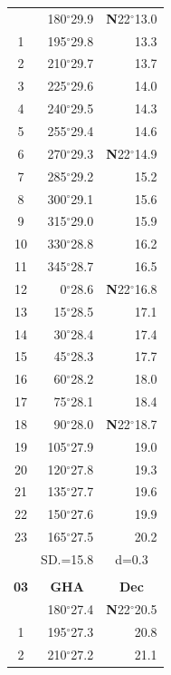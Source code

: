 \documentclass[10pt, a4paper]{report}
\begin{document}
\begin{scriptsize}
\begin{tabular*}{0.2\textwidth}[t]{@{\extracolsep{\fill}}|c|rr|}
\hline\rule{0pt}{2.6ex}\noindent
0 & 180$^\circ$29.9 & \textbf{N}22$^\circ$13.0\\
1 & 195$^\circ$29.8 & 13.3\\
2 & 210$^\circ$29.7 & 13.7\\
3 & 225$^\circ$29.6 & \raisebox{0.24ex}{\boldmath$\cdot$~\boldmath$\cdot$~~}14.0\\
4 & 240$^\circ$29.5 & 14.3\\
5 & 255$^\circ$29.4 & 14.6\\[2Pt]
6 & 270$^\circ$29.3 & \textbf{N}22$^\circ$14.9\\
7 & 285$^\circ$29.2 & 15.2\\
8 & 300$^\circ$29.1 & 15.6\\
9 & 315$^\circ$29.0 & \raisebox{0.24ex}{\boldmath$\cdot$~\boldmath$\cdot$~~}15.9\\
10 & 330$^\circ$28.8 & 16.2\\
11 & 345$^\circ$28.7 & 16.5\\[2Pt]
12 & 0$^\circ$28.6 & \textbf{N}22$^\circ$16.8\\
13 & 15$^\circ$28.5 & 17.1\\
14 & 30$^\circ$28.4 & 17.4\\
15 & 45$^\circ$28.3 & \raisebox{0.24ex}{\boldmath$\cdot$~\boldmath$\cdot$~~}17.7\\
16 & 60$^\circ$28.2 & 18.0\\
17 & 75$^\circ$28.1 & 18.4\\[2Pt]
18 & 90$^\circ$28.0 & \textbf{N}22$^\circ$18.7\\
19 & 105$^\circ$27.9 & 19.0\\
20 & 120$^\circ$27.8 & 19.3\\
21 & 135$^\circ$27.7 & \raisebox{0.24ex}{\boldmath$\cdot$~\boldmath$\cdot$~~}19.6\\
22 & 150$^\circ$27.6 & 19.9\\
23 & 165$^\circ$27.5 & 20.2\\
\hline
\rule{0pt}{2.4ex} & \multicolumn{1}{c}{SD.=15.8} & \multicolumn{1}{c|}{d=0.3}\\
\hline
\multicolumn{1}{c}{}\\[-0.5ex]\hline
\multicolumn{1}{|c|}{\rule{0pt}{2.6ex}\textbf{03}} & \multicolumn{1}{c}{\textbf{GHA}} & \multicolumn{1}{c|}{\textbf{Dec}}\\
\hline\rule{0pt}{2.6ex}\noindent
0 & 180$^\circ$27.4 & \textbf{N}22$^\circ$20.5\\
1 & 195$^\circ$27.3 & 20.8\\
2 & 210$^\circ$27.2 & 21.1\\

\end{tabular*}
\end{scriptsize}
\end{document}
